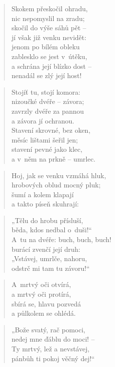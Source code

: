 \begin{verse}
Skokem přeskočil ohradu, \\
nic nepomyslil na zradu; \\
skočil do výše sáhů pět -- \\
jí však již venku nevidět: \\
jenom po bílém obleku \\
zablesklo se jest v~útěku, \\
a schrána její blízko dost -- \\
nenadál se zlý její host!
\end{verse}

\begin{verse}
Stojíť tu, stojí komora: \\
nizoučké dvéře -- závora; \\
zavrzly dvéře za pannou \\
a závora jí ochranou. \\
Stavení skrovné, bez oken, \\
měsíc lištami šeřil jen; \\
stavení pevné jako klec, \\
a v~něm na prkně -- umrlec.
\end{verse}

\begin{verse}
Hoj, jak se venku vzmáhá hluk, \\
hrobových oblud mocný pluk; \\
šumí a kolem klapají \\
a takto píseň skuhrají:
\end{verse}

\begin{verse}
„Tělu do hrobu přísluší, \\
běda, kdos nedbal o~duši!“ \\
A~tu na dvéře: buch, buch, buch! \\
burácí zvenčí její druh: \\
„Vstávej, umrlče, nahoru, \\
odstrč mi tam tu závoru!“
\end{verse}

\begin{verse}
A~mrtvý oči otvírá, \\
a mrtvý oči protírá, \\
sbírá se, hlavu pozvedá \\
a půlkolem se ohlédá.
\end{verse}

\begin{verse}
„Bože svatý, rač pomoci, \\
nedej mne ďáblu do moci! -- \\
Ty mrtvý, lež a nevstávej, \\
pánbůh ti pokoj věčný dej!“
\end{verse}

